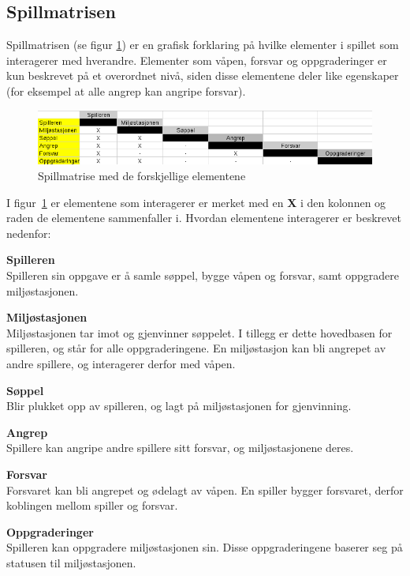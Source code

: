 \subsection{Spillmatrisen}
Spillmatrisen (se figur \ref{fig:spillmatrise}) er en grafisk forklaring
på hvilke elementer i spillet som interagerer med hverandre. Elementer
som våpen, forsvar og oppgraderinger er kun beskrevet på et overordnet
nivå, siden disse elementene deler like egenskaper (for eksempel at alle
angrep kan angripe forsvar).
\begin{center}
\begin{figure} [H]
\includegraphics[scale=0.6]{images/spillmatrise.png}
\caption{Spillmatrise med de forskjellige elementene}
\label{fig:spillmatrise}
\end{figure}
\end{center}
I figur~\ref{fig:spillmatrise} er elementene som interagerer er merket
med en \textbf{X} i den kolonnen og raden de elementene sammenfaller i.
Hvordan elementene interagerer er beskrevet nedenfor:
\begin{description}
\item \textbf{Spilleren}\\Spilleren sin oppgave er å samle søppel,
bygge våpen og forsvar, samt oppgradere miljøstasjonen.
\item \textbf{Miljøstasjonen}\\Miljøstasjonen tar imot og gjenvinner
søppelet. I tillegg er dette hovedbasen for spilleren, og står for alle
oppgraderingene. En miljøstasjon kan bli angrepet av andre spillere, og
interagerer derfor med våpen.
\item \textbf{Søppel}\\Blir plukket opp av spilleren, og lagt på
miljøstasjonen for gjenvinning.
\item \textbf{Angrep}\\Spillere kan angripe andre spillere sitt forsvar,
og miljøstasjonene deres.
\item \textbf{Forsvar}\\Forsvaret kan bli angrepet og ødelagt av våpen.
En spiller bygger forsvaret, derfor koblingen mellom spiller og forsvar.
\item \textbf{Oppgraderinger}\\Spilleren kan oppgradere miljøstasjonen
sin. Disse oppgraderingene baserer seg på statusen til miljøstasjonen.
\end{description}

